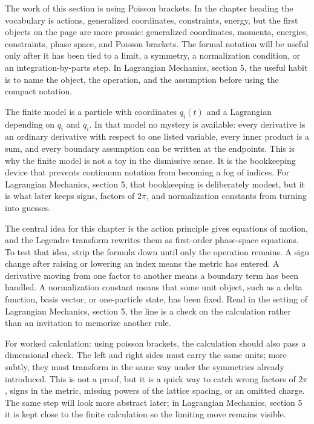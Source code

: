 The work of this section is using Poisson brackets.  In the chapter heading the vocabulary is actions, generalized coordinates, constraints, energy, but the first objects on the page are more prosaic: generalized coordinates, momenta, energies, constraints, phase space, and Poisson brackets.  The formal notation will be useful only after it has been tied to a limit, a symmetry, a normalization condition, or an integration-by-parts step.  In Lagrangian Mechanics, section 5, the useful habit is to name the object, the operation, and the assumption before using the compact notation.

The finite model is a particle with coordinates \(q_i(t)\) and a Lagrangian depending on \(q_i\) and \(\dot q_i\).  In that model no mystery is available: every derivative is an ordinary derivative with respect to one listed variable, every inner product is a sum, and every boundary assumption can be written at the endpoints.  This is why the finite model is not a toy in the dismissive sense.  It is the bookkeeping device that prevents continuum notation from becoming a fog of indices.  For Lagrangian Mechanics, section 5, that bookkeeping is deliberately modest, but it is what later keeps signs, factors of \(2\pi\), and normalization constants from turning into guesses.

The central idea for this chapter is the action principle gives equations of motion, and the Legendre transform rewrites them as first-order phase-space equations.  To test that idea, strip the formula down until only the operation remains.  A sign change after raising or lowering an index means the metric has entered.  A derivative moving from one factor to another means a boundary term has been handled.  A normalization constant means that some unit object, such as a delta function, basis vector, or one-particle state, has been fixed.  Read in the setting of Lagrangian Mechanics, section 5, the line is a check on the calculation rather than an invitation to memorize another rule.

For worked calculation: using poisson brackets, the calculation should also pass a dimensional check.  The left and right sides must carry the same units; more subtly, they must transform in the same way under the symmetries already introduced.  This is not a proof, but it is a quick way to catch wrong factors of \(2\pi\), signs in the metric, missing powers of the lattice spacing, or an omitted charge.  The same step will look more abstract later; in Lagrangian Mechanics, section 5 it is kept close to the finite calculation so the limiting move remains visible.

